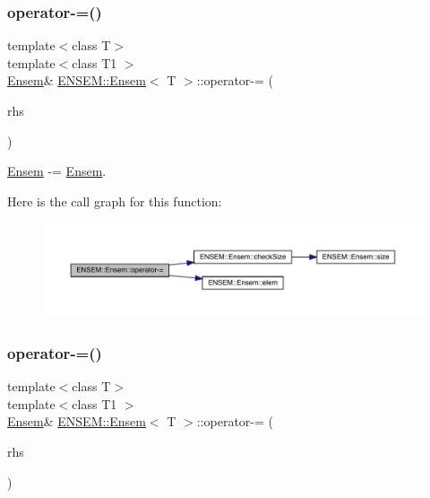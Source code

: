 \subsubsection{\texorpdfstring{operator-\/=()}{operator-=()}\hspace{0.1cm}{\footnotesize\ttfamily [4/6]}}
{\footnotesize\ttfamily template$<$class T$>$ \\
template$<$class T1 $>$ \\
\mbox{\hyperlink{classENSEM_1_1Ensem}{Ensem}}\& \mbox{\hyperlink{classENSEM_1_1Ensem}{E\+N\+S\+E\+M\+::\+Ensem}}$<$ T $>$\+::operator-\/= (\begin{DoxyParamCaption}\item[{const \mbox{\hyperlink{classENSEM_1_1Ensem}{Ensem}}$<$ T1 $>$ \&}]{rhs }\end{DoxyParamCaption})\hspace{0.3cm}{\ttfamily [inline]}}



\mbox{\hyperlink{classENSEM_1_1Ensem}{Ensem}} -\/= \mbox{\hyperlink{classENSEM_1_1Ensem}{Ensem}}. 

Here is the call graph for this function\+:
\nopagebreak
\begin{figure}[H]
\begin{center}
\leavevmode
\includegraphics[width=350pt]{d7/d3e/classENSEM_1_1Ensem_ae3f3e36d96a4600e56c2b139e7897186_cgraph}
\end{center}
\end{figure}
\mbox{\label{classENSEM_1_1Ensem_ae3f3e36d96a4600e56c2b139e7897186}} 
\subsubsection{\texorpdfstring{operator-\/=()}{operator-=()}\hspace{0.1cm}{\footnotesize\ttfamily [5/6]}}
{\footnotesize\ttfamily template$<$class T$>$ \\
template$<$class T1 $>$ \\
\mbox{\hyperlink{classENSEM_1_1Ensem}{Ensem}}\& \mbox{\hyperlink{classENSEM_1_1Ensem}{E\+N\+S\+E\+M\+::\+Ensem}}$<$ T $>$\+::operator-\/= (\begin{DoxyParamCaption}\item[{const \mbox{\hyperlink{classENSEM_1_1Ensem}{Ensem}}$<$ T1 $>$ \&}]{rhs }\end{DoxyParamCaption})\hspace{0.3cm}{\ttfamily [inline]}}



